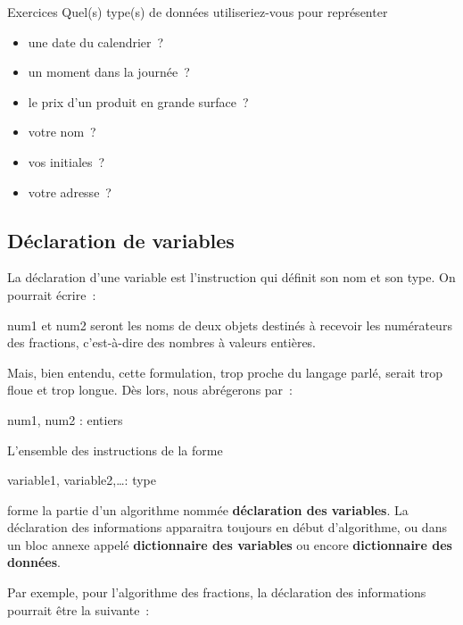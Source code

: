 			\begin{Emphase}[exercice]{Exercices}
				Quel(s) type(s) de données utiliseriez-vous 
				pour représenter 
				\begin{itemize}
					\item une date du calendrier~?
					\item un moment dans la journée~?
					\item le prix d’un produit en grande surface~?
					\item votre nom~?
					\item vos initiales~?
					\item votre adresse~?
				\end{itemize}
				\bigskip
			\end{Emphase}

		\subsection{Déclaration de variables}

			La déclaration d’une variable est l’instruction 
			qui définit son nom et son type. On pourrait écrire~:

			\begin{Pseudocode}
				\Stmt num1 et num2 seront les noms de deux objets destinés à recevoir
				\Stmt les numérateurs des fractions, c’est-à-dire des nombres à valeurs entières.
			\end{Pseudocode}
			
			Mais, bien entendu, cette formulation, trop proche du
			langage parlé, serait trop floue et trop longue. 
			Dès lors, nous abrégerons par~:

			\begin{Pseudocode}
				\Decl num1, num2 : entiers
			\end{Pseudocode}

			\marginicon{definition}
			L’ensemble des instructions de la forme

			\begin{Pseudocode}
				\Decl variable1, variable2,\ldots : type
			\end{Pseudocode}

			forme la partie d’un algorithme nommée 
			\textbf{déclaration des variables}. 
			La déclaration des informations apparaitra toujours en
			début d’algorithme, ou dans un bloc annexe appelé 
			\textbf{dictionnaire des variables} 
			ou encore \textbf{dictionnaire des données}.

			Par exemple, pour l’algorithme des fractions, 
			la déclaration des informations pourrait être la suivante~:

